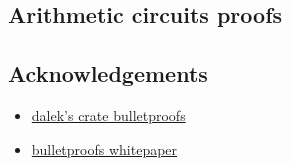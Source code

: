 \documentclass[../lecture-notes-148x210.tex]{subfiles}
\begin{document}
\subsection{Arithmetic circuits proofs}



\subsection*{Acknowledgements}

\begin{itemize}
    \item \href{https://doc-internal.dalek.rs/bulletproofs/index.html}{dalek's crate bulletproofs}
    \item \href{https://eprint.iacr.org/2017/1066.pdf}{bulletproofs whitepaper}
\end{itemize}
\end{document}
